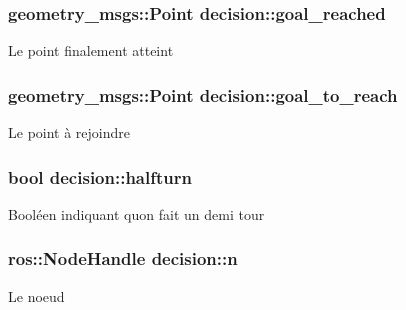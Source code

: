 \subsubsection[{\texorpdfstring{goal\+\_\+reached}{goal_reached}}]{\setlength{\rightskip}{0pt plus 5cm}geometry\+\_\+msgs\+::\+Point decision\+::goal\+\_\+reached\hspace{0.3cm}{\ttfamily [private]}}\hypertarget{classdecision_a2a762dcba1f72fb4b43a11bea161a923}{}\label{classdecision_a2a762dcba1f72fb4b43a11bea161a923}
Le point finalement atteint 
\subsubsection[{\texorpdfstring{goal\+\_\+to\+\_\+reach}{goal_to_reach}}]{\setlength{\rightskip}{0pt plus 5cm}geometry\+\_\+msgs\+::\+Point decision\+::goal\+\_\+to\+\_\+reach\hspace{0.3cm}{\ttfamily [private]}}\hypertarget{classdecision_ae66e7abace6dd621f23831885e1065be}{}\label{classdecision_ae66e7abace6dd621f23831885e1065be}
Le point à rejoindre 
\subsubsection[{\texorpdfstring{halfturn}{halfturn}}]{\setlength{\rightskip}{0pt plus 5cm}bool decision\+::halfturn\hspace{0.3cm}{\ttfamily [private]}}\hypertarget{classdecision_a717e13fdffeb73ec9d8a63682ea31822}{}\label{classdecision_a717e13fdffeb73ec9d8a63682ea31822}
Booléen indiquant qu\textquotesingle{}on fait un demi tour 
\subsubsection[{\texorpdfstring{n}{n}}]{\setlength{\rightskip}{0pt plus 5cm}ros\+::\+Node\+Handle decision\+::n\hspace{0.3cm}{\ttfamily [private]}}\hypertarget{classdecision_a3757d1a1da5a045caff6b58c8b71f559}{}\label{classdecision_a3757d1a1da5a045caff6b58c8b71f559}
Le noeud 
